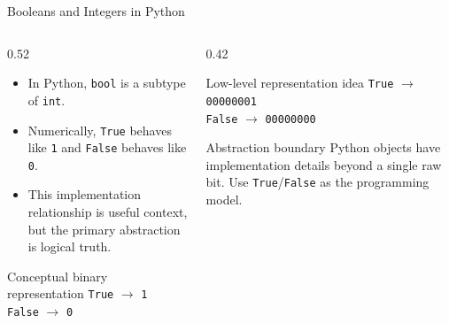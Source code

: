 \documentclass[aspectratio=169,10pt]{beamer}
\begin{document}
\begin{frame}{Booleans and Integers in Python}
  \begin{columns}[T,onlytextwidth]
    \begin{column}{0.52\textwidth}
      \begin{itemize}
        \item In Python, \texttt{bool} is a subtype of \texttt{int}.
        \item Numerically, \texttt{True} behaves like \texttt{1} and \texttt{False} behaves like \texttt{0}.
        \item This implementation relationship is useful context, but the primary abstraction is logical truth.
      \end{itemize}

      \begin{block}{Conceptual binary representation}
        \texttt{True} $\longrightarrow$ \texttt{1}\\
        \texttt{False} $\longrightarrow$ \texttt{0}
      \end{block}
    \end{column}

    \begin{column}{0.42\textwidth}
      \begin{block}{Low-level representation idea}
        \texttt{True} $\longrightarrow$ \texttt{00000001}\\
        \texttt{False} $\longrightarrow$ \texttt{00000000}
      \end{block}

      \begin{alertblock}{Abstraction boundary}
        Python objects have implementation details beyond a single raw bit. Use \texttt{True}/\texttt{False} as the programming model.
      \end{alertblock}
    \end{column}
  \end{columns}
\end{frame}

\end{document}
